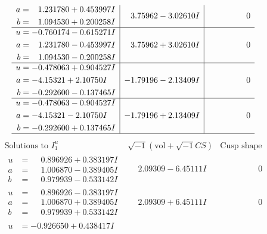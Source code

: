 \documentclass[1p]{elsarticle_modified}
\theoremstyle{definition}
\newcommand{\I}{\sqrt{-1}}
\begin{document}
$$\begin{array}{c|c|c}
\begin{aligned}
a &= \phantom{-}1.231780 + 0.453997 I \\
b &= \phantom{-}1.094530 + 0.200258 I\end{aligned}
 & \phantom{-}3.75962 - 3.02610 I & \phantom{-0.000000 } 0 \\ \hline\begin{aligned}
u &= -0.760174 - 0.615271 I \\
a &= \phantom{-}1.231780 - 0.453997 I \\
b &= \phantom{-}1.094530 - 0.200258 I\end{aligned}
 & \phantom{-}3.75962 + 3.02610 I & \phantom{-0.000000 } 0 \\ \hline\begin{aligned}
u &= -0.478063 + 0.904527 I \\
a &= -4.15321 + 2.10750 I \\
b &= -0.292600 - 0.137465 I\end{aligned}
 & -1.79196 - 2.13409 I & \phantom{-0.000000 } 0 \\ \hline\begin{aligned}
u &= -0.478063 - 0.904527 I \\
a &= -4.15321 - 2.10750 I \\
b &= -0.292600 + 0.137465 I\end{aligned}
 & -1.79196 + 2.13409 I & \phantom{-0.000000 } 0\\
 \hline 
 \end{array}$$\newpage$$\begin{array}{c|c|c}  
\text{Solutions to }I^u_{1}& \I (\text{vol} + \sqrt{-1}CS) & \text{Cusp shape}\\
 \hline 
\begin{aligned}
u &= \phantom{-}0.896926 + 0.383197 I \\
a &= \phantom{-}1.006870 - 0.389405 I \\
b &= \phantom{-}0.979939 - 0.533142 I\end{aligned}
 & \phantom{-}2.09309 - 6.45111 I & \phantom{-0.000000 } 0 \\ \hline\begin{aligned}
u &= \phantom{-}0.896926 - 0.383197 I \\
a &= \phantom{-}1.006870 + 0.389405 I \\
b &= \phantom{-}0.979939 + 0.533142 I\end{aligned}
 & \phantom{-}2.09309 + 6.45111 I & \phantom{-0.000000 } 0 \\ \hline\begin{aligned}
u &= -0.926650 + 0.438417 I \\

\end{aligned}
\end{array}$$
\end{document}
